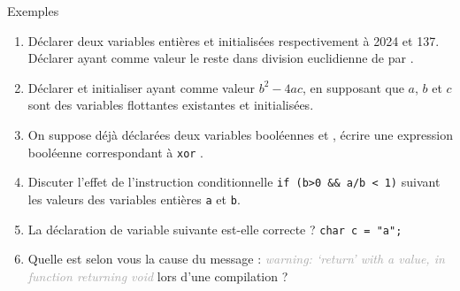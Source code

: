 \documentclass[10pt]{beamer}
\begin{document}
\begin{frame}{\Ctitle}{\stitle}
	\begin{exampleblock}{Exemples}
		\begin{enumerate}
		\item<1-> Déclarer deux variables entières  et  initialisées respectivement à 2024 et 137. Déclarer  ayant comme valeur le reste dans division euclidienne de  par .
		\item<2-> Déclarer et initialiser  ayant comme valeur $b^2 - 4ac$, en supposant que $a$, $b$ et $c$ sont des variables flottantes existantes et initialisées.
		\item<3-> On suppose déjà déclarées deux variables booléennes  et , écrire une expression booléenne correspondant à  {\tt xor} . 
		\item<4-> Discuter l'effet de l'instruction conditionnelle \texttt{if (b>0 && a/b < 1)} suivant les valeurs des variables entières {\tt a} et {\tt b}.
		\item<5-> La déclaration de variable suivante est-elle correcte ? \texttt{char c = "a";} 
		\item<6-> Quelle est selon vous la cause du message : \textit{\textcolor{darkgray}{warning: ‘return’ with a value, in function returning void}} lors d'une compilation ?
	\end{enumerate}
	\end{exampleblock}
\end{frame}
\end{document}
